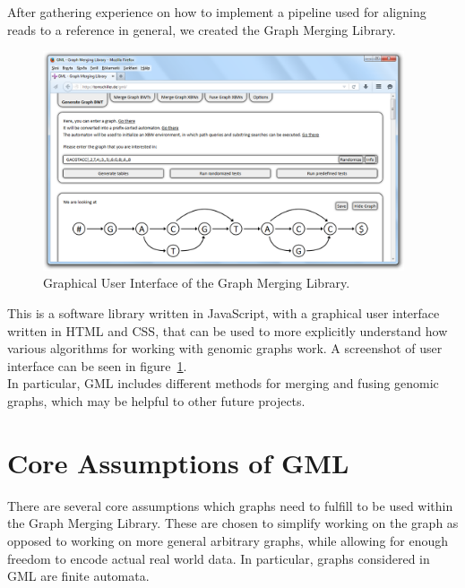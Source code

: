 \documentclass[a4paper,12pt,twoside,BCOR=10mm]{scrbook}
\begin{document}
After gathering experience on how to implement a pipeline used for aligning reads to a reference in general,
we created the Graph Merging Library.
\begin{figure}[!htb]
\centering
\includegraphics[width=0.95\textwidth]{evo_gml_3.png}
\caption[GUI of the Graph Merging Library]{Graphical User Interface of the Graph Merging Library.} \label{fig:evo_gml_3}
\end{figure}
This is a software library written in JavaScript, with a graphical user interface written in HTML and CSS,
that can be used to more explicitly understand how various algorithms for working with genomic graphs work.
A screenshot of user interface can be seen in figure~\ref{fig:evo_gml_3}. \\
In particular, GML includes different methods for merging and fusing genomic graphs,
which may be helpful to other future projects.

\section{Core Assumptions of GML}
\label{sec:gml_core_assumptions}
%

There are several core assumptions which graphs need to fulfill to be used within the Graph Merging Library.
These are chosen to simplify working on the graph as opposed to working on more general arbitrary graphs,
while allowing for enough freedom to encode actual real world data.
In particular, graphs considered in GML are finite automata.
\end{document}
